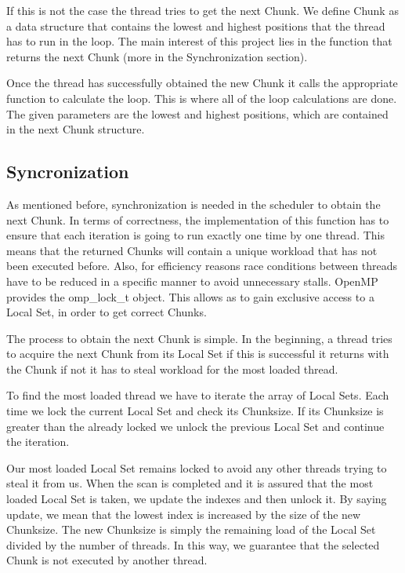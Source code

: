 \documentclass[12pt,a4paper]{article}
\begin{document}
If this is not the case the thread tries to get the next Chunk. We define Chunk as a data structure that contains the lowest and highest positions that the thread has to run in the loop. The main interest of this project lies in the function that returns the next Chunk (more in the Synchronization section).

Once the thread has successfully obtained the new Chunk it calls the appropriate function to calculate the loop. This is where all of the loop calculations are done. The given parameters are the lowest and highest positions, which are contained in the next Chunk structure.

\subsection{Syncronization}
As mentioned before, synchronization is needed in the scheduler to obtain the next Chunk. In terms of correctness, the implementation of this function has to ensure that each iteration is going to run exactly one time by one thread. This means that the returned Chunks will contain a unique workload that has not been executed before. Also, for efficiency reasons race conditions between threads have to be reduced in a specific manner to avoid unnecessary stalls. OpenMP provides the omp\_lock\_t object. This allows as to gain exclusive access to a Local Set, in order to get correct Chunks.

The process to obtain the next Chunk is simple. In the beginning, a thread tries to acquire the next Chunk from its Local Set if this is successful it returns with the Chunk if not it has to steal workload for the most loaded thread.

To find the most loaded thread we have to iterate the array of Local Sets. Each time we lock the current Local Set and check its Chunksize. If its Chunksize is greater than the already locked we unlock the previous Local Set and continue the iteration.

Our most loaded Local Set remains locked to avoid any other threads trying to steal it from us. When the scan is completed and it is assured that the most loaded Local Set is taken, we update the indexes and then unlock it. By saying update, we mean that the lowest index is increased by the size of the new Chunksize. The new Chunksize is simply the remaining load of the Local Set divided by the number of threads. In this way, we guarantee that the selected Chunk is not executed by another thread. 
\end{document}
